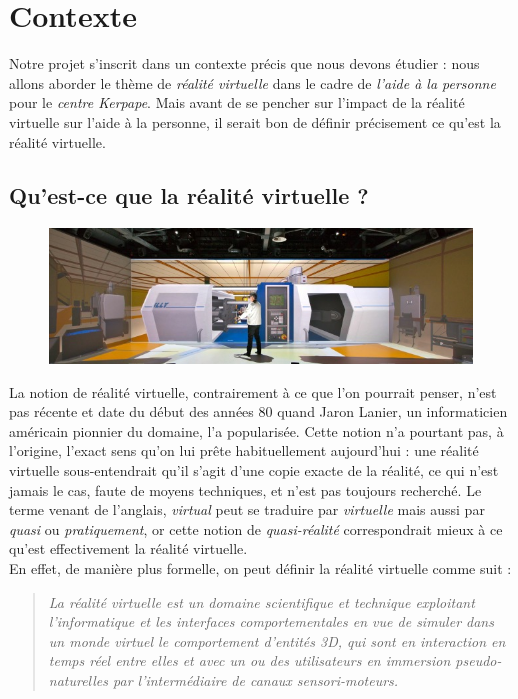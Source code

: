 \section{Contexte}

Notre projet s'inscrit dans un contexte précis que nous devons étudier : nous allons aborder le thème de \emph{réalité virtuelle} dans le cadre de \emph{l'aide à la personne} pour le \emph{centre Kerpape}. Mais avant de se pencher sur l'impact de la réalité virtuelle sur l'aide à la personne, il serait bon de définir précisement ce qu'est la réalité virtuelle.

\subsection{Qu'est-ce que la réalité virtuelle ?}
\begin{figure}
	\centering
	\includegraphics[scale=0.5]{1-PreEtude/img/rv_1.jpg}
\end{figure}
La notion de réalité virtuelle, contrairement à ce que l'on pourrait penser, n'est pas récente et date du début des années 80 quand Jaron Lanier, un informaticien américain pionnier du domaine, l'a popularisée. Cette notion n'a pourtant pas, à l'origine, l'exact sens qu'on lui prête habituellement aujourd'hui : une réalité virtuelle sous-entendrait qu'il s'agit d'une copie exacte de la réalité, ce qui n'est jamais le cas, faute de moyens techniques, et n'est pas toujours recherché. Le terme venant  de l'anglais, \emph{virtual} peut se traduire par \emph{virtuelle} mais aussi par \emph{quasi} ou \emph{pratiquement}, or cette notion de \emph{quasi-réalité} correspondrait mieux à ce qu'est effectivement la réalité virtuelle. \\

En effet, de manière plus formelle, on peut définir la réalité virtuelle comme suit :

\begin{quote}\og \emph{La réalité virtuelle est un domaine scientifique et technique exploitant l'informatique et les interfaces comportementales en vue de simuler dans un monde virtuel le comportement d'entités 3D, qui sont en interaction en temps réel entre elles et avec un ou des utilisateurs en immersion pseudo-naturelles par l'intermédiaire de canaux sensori-moteurs.} \fg\cite{traiteRV1}\end{quote}

